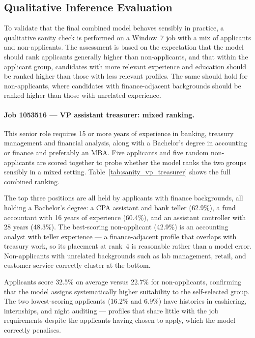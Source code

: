 \subsection{Qualitative Inference Evaluation}
\label{sec:exp_recruiter_sanity}

To validate that the final combined model behaves sensibly in practice, a qualitative sanity check is performed on a Window~7 job with a mix of applicants and non-applicants. The assessment is based on the expectation that the model should rank applicants generally higher than non-applicants, and that within the applicant group, candidates with more relevant experience and education should be ranked higher than those with less relevant profiles. The same should hold for non-applicants, where candidates with finance-adjacent backgrounds should be ranked higher than those with unrelated experience.


\paragraph{Job 1053516 — VP assistant treasurer: mixed ranking.}
This senior role requires 15 or more years of experience in banking,
treasury management and financial analysis, along with a Bachelor's
degree in accounting or finance and preferably an MBA. Five applicants
and five random non-applicants are scored together to probe whether
the model ranks the two groups sensibly in a mixed setting.
Table~\ref{tab:sanity_vp_treasurer} shows the full combined ranking.

The top three positions are all held by applicants with finance
backgrounds, all holding a Bachelor's degree: a CPA assistant and bank teller (62.9\%), a fund
accountant with 16 years of experience (60.4\%), and an assistant
controller with 28 years (48.3\%). The best-scoring non-applicant
(42.9\%) is an accounting analyst with teller experience --- a
finance-adjacent profile that overlaps with treasury work,
so its placement at rank~4 is reasonable rather than a model error.
Non-applicants with unrelated backgrounds such as lab management,
retail, and customer service correctly cluster at the bottom.

Applicants score 32.5\% on average versus 22.7\% for non-applicants,
confirming that the model assigns systematically higher suitability to
the self-selected group. The two lowest-scoring applicants (16.2\% and
6.9\%) have histories in cashiering, internships, and night auditing
--- profiles that share little with the job requirements despite
the applicants having chosen to apply, which the model correctly
penalises.

